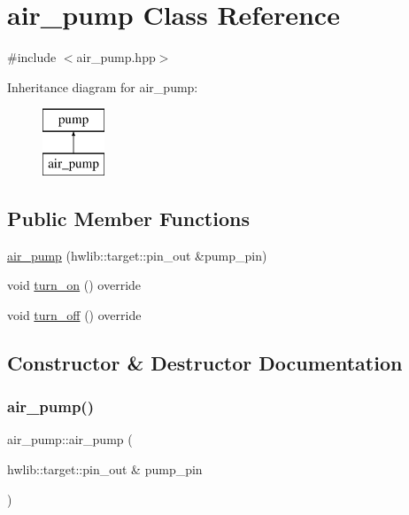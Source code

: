 \hypertarget{classair__pump}{}\section{air\+\_\+pump Class Reference}
\label{classair__pump}


{\ttfamily \#include $<$air\+\_\+pump.\+hpp$>$}

Inheritance diagram for air\+\_\+pump\+:\begin{figure}[H]
\begin{center}
\leavevmode
\includegraphics[height=2.000000cm]{classair__pump}
\end{center}
\end{figure}
\subsection*{Public Member Functions}
\begin{DoxyCompactItemize}
\item 
\hyperlink{classair__pump_a11773323e73f09c8e10e741815dab88a}{air\+\_\+pump} (hwlib\+::target\+::pin\+\_\+out \&pump\+\_\+pin)
\item 
void \hyperlink{classair__pump_a4d97870633167dda02141e0630e468a3}{turn\+\_\+on} () override
\item 
void \hyperlink{classair__pump_a9162180a77749f04ae735debb3f36bf9}{turn\+\_\+off} () override
\end{DoxyCompactItemize}


\subsection{Constructor \& Destructor Documentation}
\mbox{\label{classair__pump_a11773323e73f09c8e10e741815dab88a}} 
\subsubsection{\texorpdfstring{air\+\_\+pump()}{air\_pump()}}
{\footnotesize\ttfamily air\+\_\+pump\+::air\+\_\+pump (\begin{DoxyParamCaption}\item[{hwlib\+::target\+::pin\+\_\+out \&}]{pump\+\_\+pin }\end{DoxyParamCaption})}



